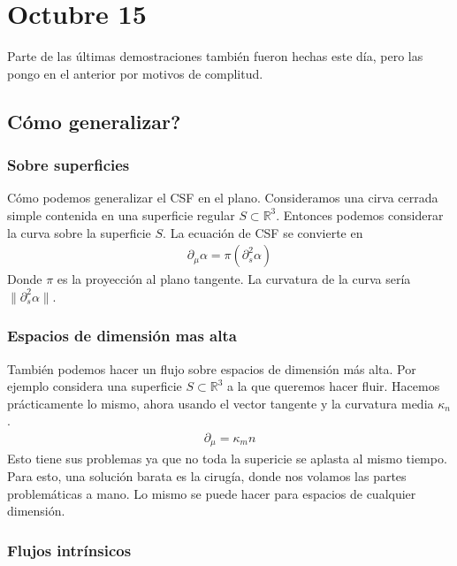 \documentclass{article}
\theoremstyle{mytheoremstyle}
\theoremstyle{mytheoremstyle}
\theoremstyle{myproblemstyle}
\begin{document}
      \section{Octubre 15}
      \footnotesize{Parte de las últimas demostraciones también fueron hechas este día, pero las pongo en el anterior por motivos de complitud.}
      \subsection{Cómo generalizar?}

      \subsubsection{Sobre superficies}

      Cómo podemos generalizar el CSF en el plano. Consideramos una cirva cerrada simple contenida en una superficie regular $S \subset{ \mathbb{R}^3}$.  Entonces podemos considerar la curva sobre la superficie $S$. La ecuación de CSF se convierte en 
      \begin{align}
        \partial_\mu \alpha = \pi (\partial^2_s \alpha)
      \end{align}
      Donde $\pi$ es la proyección al plano tangente. La curvatura de la curva sería $\|\partial^2_s \alpha\|$.
      \subsubsection{Espacios de dimensión mas alta}
      También podemos hacer un flujo sobre espacios de dimensión más alta. Por ejemplo considera una superficie $S\subset \mathbb{R}^3$ a la que queremos hacer fluir. Hacemos prácticamente lo mismo, ahora usando el vector tangente y la curvatura media $\kappa_n$. 
      \begin{align}
        \partial_\mu = \kappa_m n
      \end{align}
      Esto tiene sus problemas ya que no toda la supericie se aplasta al mismo tiempo. Para esto, una solución barata es la cirugía, donde nos volamos las partes problemáticas a mano. Lo mismo se puede hacer para espacios de cualquier dimensión.
      \subsubsection{Flujos intrínsicos}
\end{document}
